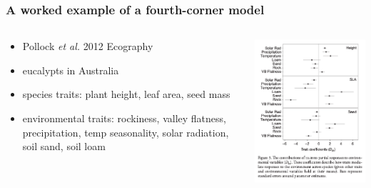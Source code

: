\documentclass{beamer}
\begin{document}
\begin{frame}
  \frametitle{A worked example of a fourth-corner model}

  \begin{columns}
    \begin{column}{0.4\textwidth}
      \begin{itemize}
        \item Pollock \textit{et al.} 2012 Ecography
        \item eucalypts in Australia
        \item species traits: plant height, leaf area, seed mass
        \item environmental traits: rockiness, valley flatness, 
          precipitation, temp seasonality, solar radiation, soil sand, soil loam
      \end{itemize}
    \end{column}
    \begin{column}{0.6\textwidth}
      \includegraphics[height=0.8\textheight,width=\textwidth,keepaspectratio=true]{figure/pollock_trees}
    \end{column}
  \end{columns}
\end{frame}
\end{document}
